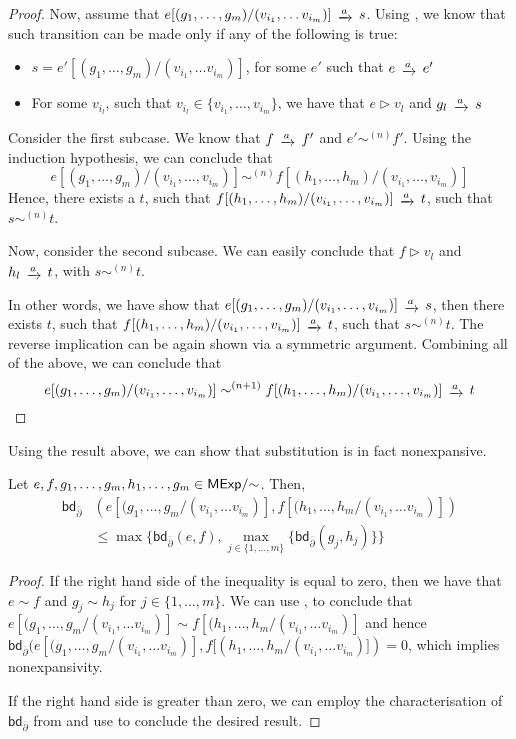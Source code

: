 \begin{proof}
		Now, assume that  $e[(g_1, \dots, g_m)/ (v_{i_1}, \dots v_{i_m})] \tr{a} s$. Using , we know that such transition can be made only if any of the following is true:
		\begin{itemize}
			\item $s = e'[(g_1, \dots, g_m)/ (v_{i_1}, \dots v_{i_m})]$, for some $e'$ such that $e \tr{a} e'$
			\item For some $v_{i_l}$, such that $v_{i_l} \in \{v_{i_1}, \dots, v_{i_m}\}$, we have that $e \rhd v_l$ and $g_l \tr{a} s$
		\end{itemize}
		Consider the first subcase. We know that $f \tr{a} f'$ and $e' \sim^{(n)} f'$. Using the induction hypothesis, we can conclude that 
		$$
			e[(g_1, \dots, g_m)/(v_{i_1}, \dots, v_{i_m})] \sim^{(n)} f[(h_1, \dots, h_m)/(v_{i_1}, \dots, v_{i_m})]
		$$
		Hence, there exists a $t$, such that $f[(h_1, \dots, h_m)/(v_{i_1}, \dots, v_{i_m})] \tr{a} t$, such that $s \sim^{(n)} t$.
		
		Now, consider the second subcase. We can easily conclude that $f \rhd v_l$ and $h_l \tr{a} t$, with $s \sim^{(n)} t$.
		
		In other words, we have show that $e[(g_1, \dots, g_m)/ (v_{i_1}, \dots, v_{i_m})] \tr{a} s$, then there exists $t$, such that $f[(h_1, \dots, h_m)/(v_{i_1}, \dots, v_{i_m})] \tr{a} t$, such that $s \sim^{(n)} t$. The reverse implication can be again shown via a symmetric argument. Combining all of the above, we can conclude that
		$$e[(g_1, \dots, g_m)/ (v_{i_1}, \dots, v_{i_m})] \sim^{(n+1)} f[(h_1, \dots, h_m)/(v_{i_1}, \dots, v_{i_m})] \tr{a} t$$
\end{proof}
Using the result above, we can show that substitution is in fact nonexpansive.
\begin{corollary}\label{cor:seq_nexp}
	Let $e,f,g_1, \dots , g_m,h_1, \dots, g_m \in {\mathsf{MExp}}/{\sim}$. Then,
	\begin{align*}
		\mathsf{bd}_{\overline{\partial}}&\left(e[(g_1, \dots, g_m/(v_{i_1}, \dots v_{i_m})], f[(h_1, \dots, h_m/(v_{i_1}, \dots v_{i_m})]\right)\\& \leq \max\{\mathsf{bd}_{\overline{\partial}}(e,f),  \max_{j \in \{1, \dots, m\}} \{\mathsf{bd}_{\overline{\partial}}(g_j,h_j)\}\}
	\end{align*}

\end{corollary}
\begin{proof}
If the right hand side of the inequality is equal to zero, then we have that $e \sim f$ and $g_j \sim h_j$ for $j \in \{1, \dots, m\}$. We can use , to conclude that $e[(g_1, \dots, g_m/(v_{i_1}, \dots v_{i_m})] \sim f[(h_1, \dots, h_m/(v_{i_1}, \dots v_{i_m})]$ and hence $\mathsf{bd}_{\overline{\partial}}(e[(g_1, \dots, g_m/(v_{i_1}, \dots v_{i_m})], f[(h_1, \dots, h_m/(v_{i_1}, \dots v_{i_m})]) = 0$, which implies nonexpansivity.
	
If the right hand side is greater than zero, we can employ the characterisation of $\mathsf{bd}_{\overline{\partial}}$ from  and use  to conclude the desired result. 
\end{proof}

